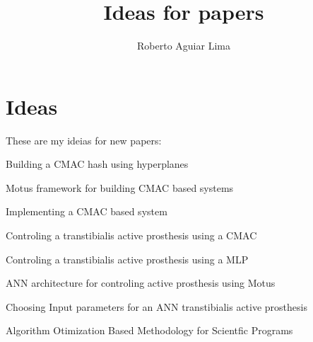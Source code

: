 \documentclass{article}
\author{Roberto Aguiar Lima}
\title{Ideas for papers}
\begin{document}
	\maketitle
	\section{Ideas}
		These are my ideias for new papers:

		Building a CMAC hash using hyperplanes 

		Motus framework for building CMAC based systems

		Implementing a CMAC based system

		Controling a transtibialis active prosthesis using a CMAC

		Controling a transtibialis active prosthesis using a MLP

		ANN architecture for controling active prosthesis using Motus

		Choosing Input parameters for an ANN transtibialis active prosthesis

		Algorithm Otimization Based Methodology for Scientfic Programs
\end{document}

